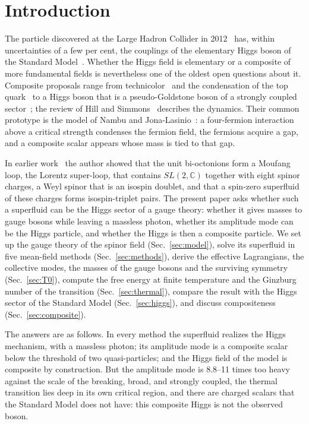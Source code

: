 \documentclass[aps,prd,twocolumn,superscriptaddress,nofootinbib,floatfix,longbibliography]{revtex4-2}
\begin{document}
\section{Introduction}
\label{sec:intro}

The particle discovered at the Large Hadron Collider in 2012~\cite{ATLAS2012,CMS2012} has, within uncertainties of a few
per cent, the couplings of the elementary Higgs boson of the Standard Model~\cite{ATLAS2022,CMS2022,PDG2024}. Whether the
Higgs field is elementary or a composite of more fundamental fields is nevertheless one of the oldest open questions about
it. Composite proposals range from technicolor~\cite{Weinberg1976,Susskind1979} and the condensation of the top
quark~\cite{Miransky1989,BHL1990} to a Higgs boson that is a pseudo-Goldstone boson of a strongly coupled
sector~\cite{KaplanGeorgi1984,Agashe2005}; the review of Hill and Simmons~\cite{HillSimmons2003} describes the dynamics. Their
common prototype is the model of Nambu and Jona-Lasinio~\cite{NJL1961}: a four-fermion interaction above a critical
strength condenses the fermion field, the fermions acquire a gap, and a composite scalar appears whose mass is tied to
that gap.

In earlier work~\cite{Nash2026} the author showed that the unit bi-octonions form a Moufang loop, the Lorentz super-loop,
that contains $SL(2,\mathbb C)$ together with eight spinor charges, a Weyl spinor that is an isospin doublet, and that a
spin-zero superfluid of these charges forms isospin-triplet pairs. The present paper asks whether such a superfluid can
be the Higgs sector of a gauge theory: whether it gives masses to gauge bosons while leaving a massless photon, whether
its amplitude mode can be the Higgs particle, and whether the Higgs is then a composite particle. We set up the gauge
theory of the spinor field (Sec.~\ref{sec:model}), solve its superfluid in five mean-field methods
(Sec.~\ref{sec:methods}), derive the effective Lagrangians, the collective modes, the masses of the gauge bosons and the
surviving symmetry (Sec.~\ref{sec:T0}), compute the free energy at finite temperature and the Ginzburg number of the
transition (Sec.~\ref{sec:thermal}), compare the result with the Higgs sector of the Standard Model
(Sec.~\ref{sec:higgs}), and discuss compositeness (Sec.~\ref{sec:composite}).

The answers are as follows. In every method the superfluid realizes the Higgs mechanism, with a massless photon; its
amplitude mode is a composite scalar below the threshold of two quasi-particles; and the Higgs field of the model is
composite by construction. But the amplitude mode is 8.8\mbox{--}11 times too heavy against the scale of the breaking, broad,
and strongly coupled, the thermal transition lies deep in its own critical region, and there are charged scalars that the
Standard Model does not have: this composite Higgs is not the observed boson.
\end{document}
